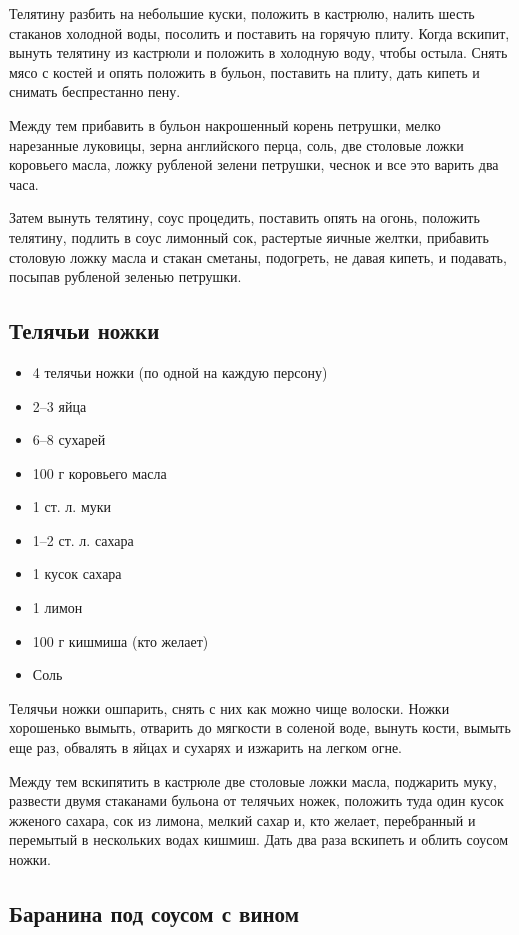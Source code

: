 Телятину разбить на небольшие куски, положить в кастрюлю, налить шесть стаканов холодной воды, посолить и поставить на горячую плиту. Когда вскипит, вынуть телятину из кастрюли и положить в холодную воду, чтобы остыла. Снять мясо с костей и опять положить в бульон, поставить на плиту, дать кипеть и снимать беспрестанно пену.

Между тем прибавить в бульон накрошенный корень петрушки, мелко нарезанные луковицы, зерна английского перца, соль, две столовые ложки коровьего масла, ложку рубленой зелени петрушки, чеснок и все это варить два часа.

Затем вынуть телятину, соус процедить, поставить опять на огонь, положить телятину, подлить в соус лимонный сок, растертые яичные желтки, прибавить столовую ложку масла и стакан сметаны, подогреть, не давая кипеть, и подавать, посыпав рубленой зеленью петрушки.

\subsection{Телячьи ножки}

\begin{itemize}
	\item 4 телячьи ножки (по одной на каждую персону) 
    \item 2–3 яйца 
    \item 6–8 сухарей 
    \item 100 г коровьего масла
    \item 1 ст. л. муки
    \item 1–2 ст. л. сахара
    \item 1 кусок сахара
    \item 1 лимон
    \item 100 г кишмиша (кто желает)
    \item Соль
\end{itemize}

Телячьи ножки ошпарить, снять с них как можно чище волоски. Ножки хорошенько вымыть, отварить до мягкости в соленой воде, вынуть кости, вымыть еще раз, обвалять в яйцах и сухарях и изжарить на легком огне.

Между тем вскипятить в кастрюле две столовые ложки масла, поджарить муку, развести двумя стаканами бульона от телячьих ножек, положить туда один кусок жженого сахара, сок из лимона, мелкий сахар и, кто желает, перебранный и перемытый в нескольких водах кишмиш. Дать два раза вскипеть и облить соусом ножки.

\subsection{Баранина под соусом с вином}

